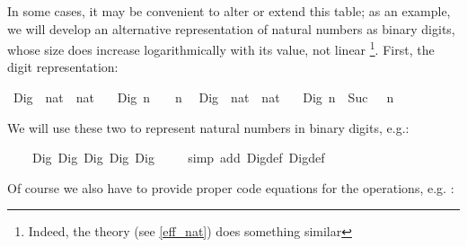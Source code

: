 \begin{isabellebody}
\begin{isamarkuptext}
  In some cases, it may be convenient to alter or
  extend this table;  as an example, we will develop an alternative
  representation of natural numbers as binary digits, whose
  size does increase logarithmically with its value, not linear
  \footnote{Indeed, the \hyperlink{theory.Efficient-Nat}{\mbox{}} theory (see \ref{eff_nat})
    does something similar}.  First, the digit representation:%
\end{isamarkuptext}%
\isamarkuptrue%
%
\isadelimquoteme
%
\endisadelimquoteme
%
\isatagquoteme
{}\isamarkupfalse%
\ Dig{}\ {\isacharcolon}{\isacharcolon}\ {\isachardoublequoteopen}nat\ {\isasymRightarrow}\ nat{\isachardoublequoteclose}\ \isanewline
\ \ {\isachardoublequoteopen}Dig{}\ n\ {\isacharequal}\ {}\ {\isacharasterisk}\ n{\isachardoublequoteclose}\isanewline
\isanewline
{}\isamarkupfalse%
\ \ Dig{}\ {\isacharcolon}{\isacharcolon}\ {\isachardoublequoteopen}nat\ {\isasymRightarrow}\ nat{\isachardoublequoteclose}\ \isanewline
\ \ {\isachardoublequoteopen}Dig{}\ n\ {\isacharequal}\ Suc\ {\isacharparenleft}{}\ {\isacharasterisk}\ n{\isacharparenright}{\isachardoublequoteclose}%
\endisatagquoteme
{\isafoldquoteme}%
%
\isadelimquoteme
%
\endisadelimquoteme
%
\begin{isamarkuptext}%
\noindent We will use these two  to represent natural numbers
  in binary digits, e.g.:%
\end{isamarkuptext}%
\isamarkuptrue%
%
\isadelimquoteme
%
\endisadelimquoteme
%
\isatagquoteme
{}\isamarkupfalse%
\ {}{}{\isacharcolon}\ {\isachardoublequoteopen}{}{}\ {\isacharequal}\ Dig{}\ {\isacharparenleft}Dig{}\ {\isacharparenleft}Dig{}\ {\isacharparenleft}Dig{}\ {\isacharparenleft}Dig{}\ {}{\isacharparenright}{\isacharparenright}{\isacharparenright}{\isacharparenright}{\isachardoublequoteclose}\isanewline
\ \ \isamarkupfalse%
\ {\isacharparenleft}simp\ add{\isacharcolon}\ Dig{}{\isacharunderscore}def\ Dig{}{\isacharunderscore}def{\isacharparenright}%
\endisatagquoteme
{\isafoldquoteme}%
%
\isadelimquoteme
%
\endisadelimquoteme
%
\begin{isamarkuptext}%
\noindent Of course we also have to provide proper code equations for
  the operations, e.g. :%

\end{isamarkuptext}
\end{isabellebody}
